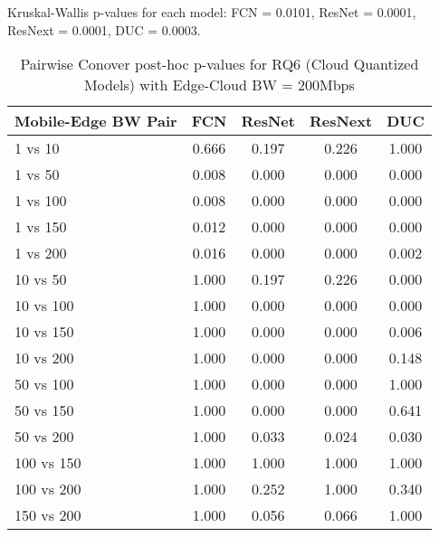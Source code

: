 \begin{table}[h]
\centering
\caption{Pairwise Conover post-hoc p-values for RQ6 (Cloud Quantized Models) with Edge-Cloud BW = 200Mbps}
\label{tab:conover_cloud_quantized_ec200}
\smallskip
Kruskal-Wallis p-values for each model: FCN = 0.0101, ResNet = 0.0001, ResNext = 0.0001, DUC = 0.0003.

\begin{tabular}{lcccc}
\toprule
Mobile-Edge BW Pair & FCN & ResNet & ResNext & DUC \\
\midrule
1 vs 10 & 0.666 & 0.197 & 0.226 & 1.000 \\
1 vs 50 & 0.008 & 0.000 & 0.000 & 0.000 \\
1 vs 100 & 0.008 & 0.000 & 0.000 & 0.000 \\
1 vs 150 & 0.012 & 0.000 & 0.000 & 0.000 \\
1 vs 200 & 0.016 & 0.000 & 0.000 & 0.002 \\
10 vs 50 & 1.000 & 0.197 & 0.226 & 0.000 \\
10 vs 100 & 1.000 & 0.000 & 0.000 & 0.000 \\
10 vs 150 & 1.000 & 0.000 & 0.000 & 0.006 \\
10 vs 200 & 1.000 & 0.000 & 0.000 & 0.148 \\
50 vs 100 & 1.000 & 0.000 & 0.000 & 1.000 \\
50 vs 150 & 1.000 & 0.000 & 0.000 & 0.641 \\
50 vs 200 & 1.000 & 0.033 & 0.024 & 0.030 \\
100 vs 150 & 1.000 & 1.000 & 1.000 & 1.000 \\
100 vs 200 & 1.000 & 0.252 & 1.000 & 0.340 \\
150 vs 200 & 1.000 & 0.056 & 0.066 & 1.000 \\
\bottomrule
\end{tabular}
\end{table}

